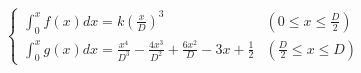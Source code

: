 \documentclass[
  11pt,
  border=2,
  convert={
    density=150 -alpha off,
    outext=.png
  },
]{standalone}
\begin{document}
$
  \begin{cases}
    \displaystyle \int_0^x f(x) dx = k\left(\frac{x}{D}\right)^3 & (0 \leq x \leq \frac{D}{2})
    \\
    \displaystyle \int_0^x g(x) dx = \frac{x^4}{D^3} - \frac{4x^3}{D^2} + \frac{6x^2}{D} - 3x + \frac{1}{2}  & (\frac{D}{2} \leq x \leq D)
  \end{cases}
$
\end{document}
